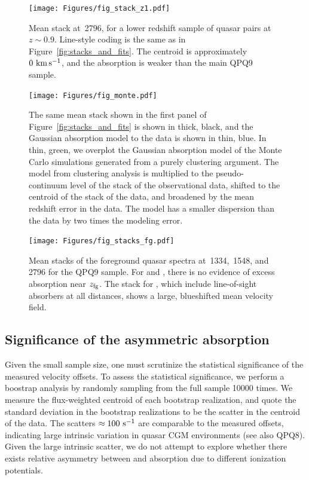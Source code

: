 \documentclass[iop]{emulateapj}
\begin{document}
\begin{figure}[!th]
\begin{minipage}[!bp]{0.35\textwidth}
\texttt{[image: Figures/fig\_stack\_z1.pdf]}
\caption{Mean stack at \,2796, for a lower redshift sample of quasar pairs at 
$z\sim0.9$. Line-style coding is the same as in Figure~\ref{fig:stacks_and_fits}. The centroid is 
approximately $0\,{\rm \,km\,s^{-1}}$, and the absorption is weaker than the main QPQ9 sample. 
}
\label{fig:stack_z1}
\texttt{[image: Figures/fig\_monte.pdf]}
\caption{The same  mean stack shown in the first panel of 
Figure~\ref{fig:stacks_and_fits} is shown in thick, black, and the Gaussian absorption model to 
the data is shown in thin, blue. In thin, green, we overplot the Gaussian absorption model of the 
Monte Carlo simulations generated from a purely clustering argument. The model from clustering 
analysis is multiplied to the pseudo-continuum level of the stack of the observational data, 
shifted to the centroid of the stack of the data, and broadened by the mean redshift error in the 
data. The model has a smaller dispersion than the data by two times the modeling error.
}
\label{fig:monte}
\end{minipage}%
\hspace{0.5in}
\begin{minipage}[!bp]{0.55\textwidth}
\texttt{[image: Figures/fig\_stacks\_fg.pdf]}
\caption{Mean stacks of the foreground quasar spectra at \,1334, \,1548, and 
\,2796 for the QPQ9 sample. For  and , there is no evidence of 
excess absorption near $z_{\rm fg}$. The stack for , which include line-of-sight 
absorbers at all distances, shows a large, blueshifted mean velocity field.
}
\label{fig:stacks_fg}
\end{minipage}
\end{figure}

\subsection{Significance of the asymmetric absorption}
\label{sec:significance_+ve}

Given the small sample size, one must scrutinize the statistical significance of the measured 
velocity offsets. To assess the statistical significance, we perform a boostrap analysis by 
randomly sampling from the full sample 10000 times. We measure the flux-weighted centroid of each 
bootstrap realization, and quote the standard deviation in the bootstrap realizations to be the 
scatter in the centroid of the data. The scatters $\approx100\,{\rm \,s^{-1}}$ are comparable 
to the measured offsets, indicating large intrinsic variation in quasar CGM environments (see 
also QPQ8). Given the large intrinsic scatter, we do not attempt to explore whether there exists 
relative asymmetry between  and  absorption due to different ionization 
potentials. 
\end{document}
